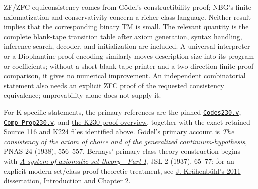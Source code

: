 ZF/ZFC equiconsistency comes from G\"odel's constructibility proof;
NBG's finite axiomatization and conservativity concern a richer class
language.  Neither result implies that the corresponding binary TM is
small.  The relevant quantity is the complete blank-tape transition
table after axiom generation, syntax handling, inference search, decoder,
and initialization are included.  A universal interpreter or a
Diophantine proof encoding similarly moves description size into its
program or coefficients; without a short blank-tape printer and a
two-direction finite-proof comparison, it gives no numerical improvement.
An independent combinatorial statement also needs an explicit ZFC proof
of the requested consistency equivalence; unprovability alone does not
supply it.

For K-specific statements, the primary references are the pinned
\href{https://github.com/elliotglazer/k230-rocq/blob/3142e4dd980f0be12f4abb636c4ae2528afc17eb/coq/logic/Codes230.v}
{\texttt{Codes230.v}},
\href{https://github.com/elliotglazer/k230-rocq/blob/3142e4dd980f0be12f4abb636c4ae2528afc17eb/coq/logic/Comp_Prop230.v}
{\texttt{Comp\_Prop230.v}}, and
\href{https://github.com/elliotglazer/k230-rocq/blob/3142e4dd980f0be12f4abb636c4ae2528afc17eb/docs/proof-overview.md}
{the K230 proof overview}, together with the exact retained Source 116
and K224 files identified above.  G\"odel's primary account is
\href{https://doi.org/10.1073/pnas.24.12.556}{\emph{The consistency of the
axiom of choice and of the generalized continuum-hypothesis}}, PNAS
24 (1938), 556--557.  Bernays' primary class-theory construction begins
with \href{https://doi.org/10.2307/2268862}{\emph{A system of axiomatic
set theory---Part I}}, JSL 2 (1937), 65--77; for an explicit modern
set/class proof-theoretic treatment, see
\href{https://home.inf.unibe.ch/ltg/publications/2011/kra11.pdf}
{J. Kr\"ahenb\"uhl's 2011 dissertation}, Introduction and Chapter 2.
